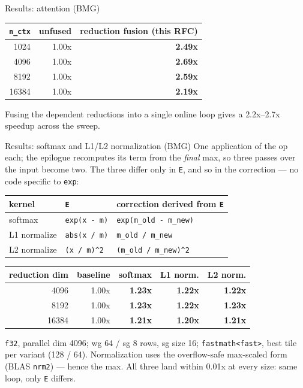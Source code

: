 \documentclass[10pt, aspectratio=169]{beamer}
\newcommand{\code}[1]{\texttt{\small #1}}
\begin{document}
\begin{frame}{Results: attention (BMG)}
  \centering
  \begin{tabular}{rrr}
    \toprule
    \code{n\_ctx} & unfused & reduction fusion (this RFC) \\
    \midrule
    1024  & 1.00x & \textbf{2.49x} \\
    4096  & 1.00x & \textbf{2.69x} \\
    8192  & 1.00x & \textbf{2.59x} \\
    16384 & 1.00x & \textbf{2.19x} \\
    \bottomrule
  \end{tabular}

  \vspace{5mm}
  \small Fusing the dependent reductions into a single online loop gives a
  \alert{2.2x--2.7x} speedup across the sweep.
\end{frame}

\begin{frame}{Results: softmax and L1/L2 normalization (BMG)}
  One application of the op each; the epilogue recomputes its term from the
  \emph{final} max, so \alert{three passes over the input become two}. The three
  differ only in \code{E}, and so in the correction --- no code specific to
  \code{exp}:

  \vspace{1mm}
  \centering
  \scriptsize
  \begin{tabular}{lll}
    \toprule
    kernel & \code{E} & correction derived from \code{E} \\
    \midrule
    softmax      & \code{exp(x - m)}   & \code{exp(m\_old - m\_new)} \\
    L1 normalize & \code{abs(x / m)}   & \code{m\_old / m\_new} \\
    L2 normalize & \code{(x / m)\^{}2} & \code{(m\_old / m\_new)\^{}2} \\
    \bottomrule
  \end{tabular}

  \vspace{1mm}
  \small
  \begin{tabular}{rrrrr}
    \toprule
    reduction dim & baseline & softmax & L1 norm. & L2 norm. \\
    \midrule
    4096  & 1.00x & \textbf{1.23x} & \textbf{1.22x} & \textbf{1.22x} \\
    8192  & 1.00x & \textbf{1.23x} & \textbf{1.22x} & \textbf{1.23x} \\
    16384 & 1.00x & \textbf{1.21x} & \textbf{1.20x} & \textbf{1.21x} \\
    \bottomrule
  \end{tabular}

  \vspace{1mm}
  \raggedright \scriptsize
  \code{f32}, parallel dim 4096; wg 64 / sg 8 rows, sg size 16;
  \code{fastmath<fast>}, best tile per variant (128 / 64). Normalization uses the
  overflow-safe max-scaled form (BLAS \code{nrm2}) --- hence the max. All three
  land within 0.01x at every size: same loop, only \code{E} differs.
\end{frame}
\end{document}
